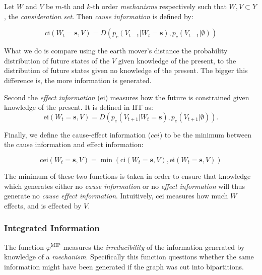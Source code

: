 Let $W$ and $V$ be $m$-th and $k$-th order \textit{mechanisms} respectively such that $W,V \subset Y$, the \textit{consideration set}. Then \textit{cause information} is defined \cite{oizumi2014phenomenology} by:

\begin{equation}
\label{def:ci}
\text{ci}(W_{t} = \mathbf{s}, V) = D\left(p_c(V_{t-1}|W_{t} = \mathbf{s}),p_c(V_{t-1}|\emptyset)\right)
\end{equation}

What we do is compare using the earth mover's distance the probability distribution of future states of the  $V $ given knowledge of the present, to the distribution of future states given no knowledge of the present. The bigger this difference is, the more information is generated. 

Second the \textit{effect information} (ei) measures how the future is constrained given knowledge of the present. It is defined in IIT \cite{oizumi2014phenomenology} as:
\begin{equation}
\label{def:ei}
\text{ei}(W_{t} = \mathbf{s}, V) = D\left(p_e(V_{t+1}|W_{t} = \mathbf{s}),p_{e}(V_{t+1}|\emptyset)\right).
\end{equation}

Finally, we define the cause-effect information ($cei$) to be the minimum between the cause information and effect information:

\begin{equation}
\label{def:cei}
\text{cei}(W_{t} = \mathbf{s}, V) = \min\left(\text{ci}(W_{t} = \mathbf{s}, V), \text{ei}(W_{t} = \mathbf{s}, V) \right)
\end{equation}

The minimum of these two functions is taken in order to ensure that knowledge which generates either no \textit{cause information} or no \textit{effect information} will thus generate no \textit{cause effect information}. Intuitively, cei measures how much $W$ effects, and is effected by $V$.

\subsubsection{Integrated Information}
\label{sec:mech_integration}
The function $\varphi^{\text{MIP}}$ measures the \textit{irreducibility} of the information generated by knowledge of a \textit{mechanism}. Specifically this function questions whether the same information might have been generated if the graph was cut into bipartitions. 

